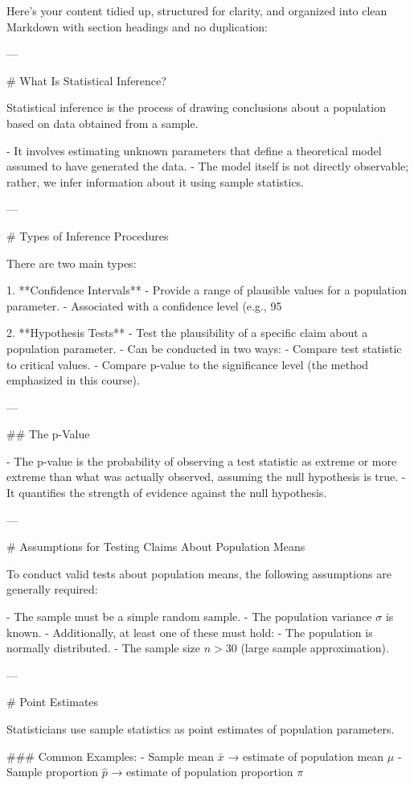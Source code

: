Here's your content tidied up, structured for clarity, and organized into clean Markdown with section headings and no duplication:

---

# What Is Statistical Inference?

Statistical inference is the process of drawing conclusions about a population based on data obtained from a sample.

- It involves estimating unknown parameters that define a theoretical model assumed to have generated the data.
- The model itself is not directly observable; rather, we infer information about it using sample statistics.

---

# Types of Inference Procedures

There are two main types:

1. **Confidence Intervals**  
   - Provide a range of plausible values for a population parameter.
   - Associated with a confidence level (e.g., 95%

2. **Hypothesis Tests**  
   - Test the plausibility of a specific claim about a population parameter.
   - Can be conducted in two ways:
     - Compare test statistic to critical values.
     - Compare p-value to the significance level (the method emphasized in this course).

---

## The p-Value

- The p-value is the probability of observing a test statistic as extreme or more extreme than what was actually observed, assuming the null hypothesis is true.
- It quantifies the strength of evidence against the null hypothesis.

---

# Assumptions for Testing Claims About Population Means

To conduct valid tests about population means, the following assumptions are generally required:

- The sample must be a simple random sample.
- The population variance \( \sigma \) is known.
- Additionally, at least one of these must hold:
  - The population is normally distributed.
  - The sample size \( n > 30 \) (large sample approximation).

---

# Point Estimates

Statisticians use sample statistics as point estimates of population parameters.

### Common Examples:
- Sample mean \( \bar{x} \) → estimate of population mean \( \mu \)
- Sample proportion \( \hat{p} \) → estimate of population proportion \( \pi \)

